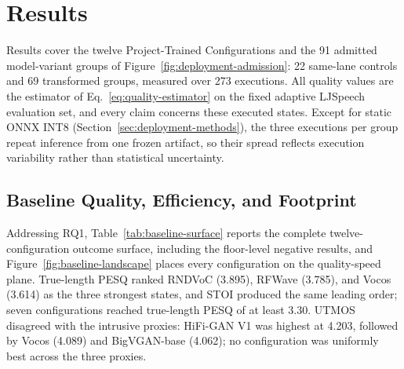 \section{Results}
\label{sec:results}

Results cover the twelve Project-Trained Configurations and the 91 admitted
model-variant groups of Figure~\ref{fig:deployment-admission}: 22 same-lane
controls and 69 transformed groups, measured over 273 executions.  All
quality values are the estimator of Eq.~\eqref{eq:quality-estimator} on the
fixed adaptive LJSpeech evaluation set, and every claim concerns these executed
states.  Except for static ONNX INT8
(Section~\ref{sec:deployment-methods}), the three executions per group
repeat inference from one frozen artifact, so their spread reflects
execution variability rather than statistical uncertainty.

\subsection{Baseline Quality, Efficiency, and Footprint}
\label{sec:baseline-results}

Addressing RQ1, Table~\ref{tab:baseline-surface} reports the complete
twelve-configuration outcome surface, including the floor-level negative
results, and
Figure~\ref{fig:baseline-landscape} places every configuration on the
quality-speed plane.  True-length PESQ ranked RNDVoC (3.895), RFWave
(3.785), and Vocos (3.614) as the three strongest states, and STOI produced
the same leading order; seven configurations reached true-length PESQ of at
least 3.30.  UTMOS disagreed with the intrusive proxies: HiFi-GAN V1 was
highest at 4.203, followed by Vocos (4.089) and BigVGAN-base (4.062); no
configuration was uniformly best across the three proxies.

\begin{table}[t]
  \centering
  \footnotesize
  \renewcommand{\arraystretch}{1.02}
  \setlength{\tabcolsep}{4pt}
  \caption{Baseline outcome surface for all twelve configurations: quality
  proxies (higher is better), parameters (millions), serialized size (MB),
  and warm real-time factors (lower is better).
  $^{\mathsection}$retained comparative CPU record
  (Section~\ref{sec:evaluation-protocols}), not a deployment-phase value;
  $^{\dagger}$B200 speed-quality frontier;
  $^{\ddagger}$parameter- and size-quality frontier;
  $^{*}$LPCNet timing (27 utterances, one execution) is excluded from
  strict frontiers.}
  \label{tab:baseline-surface}
\end{table}

